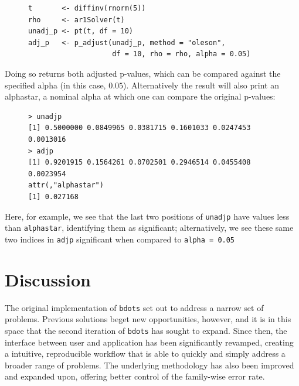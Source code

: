 \documentclass{article}
\newcommand{\xt}{\texttt}%
\begin{document}


\begin{singlespace}
\begin{figure}[H]
\centering
\begin{BVerbatim}
t       <- diffinv(rnorm(5))
rho     <- ar1Solver(t)
unadj_p <- pt(t, df = 10)
adj_p   <- p_adjust(unadj_p, method = "oleson", 
                    df = 10, rho = rho, alpha = 0.05)
\end{BVerbatim}
\end{figure}
\end{singlespace}

Doing so returns both adjusted p-values, which can be compared against the specified alpha (in this case, $0.05$). Alternatively the result will also print an alphastar, a nominal alpha at which one can compare the original p-values:

\begin{singlespace}
\begin{figure}[H]
\centering
\begin{BVerbatim}
> unadjp
[1] 0.5000000 0.0849965 0.0381715 0.1601033 0.0247453 0.0013016
> adjp
[1] 0.9201915 0.1564261 0.0702501 0.2946514 0.0455408 0.0023954
attr(,"alphastar")
[1] 0.027168
\end{BVerbatim}
\end{figure}
\end{singlespace}

Here, for example, we see that the last two positions of \xt{unadjp} have values less than \xt{alphastar}, identifying them as significant; alternatively, we see these same two indices in \xt{adjp} significant when compared to \xt{alpha = 0.05}

\section{Discussion}



The original implementation of \xt{bdots} set out to address a narrow set of problems. Previous solutions beget new opportunities, however, and it is in this space that the second iteration of \xt{bdots} has sought to expand. Since then, the interface between user and application has been significantly revamped, creating a intuitive, reproducible workflow that is able to quickly and simply address a broader range of problems. The underlying methodology has also been improved and expanded upon, offering better control of the family-wise error rate.
\end{document}
